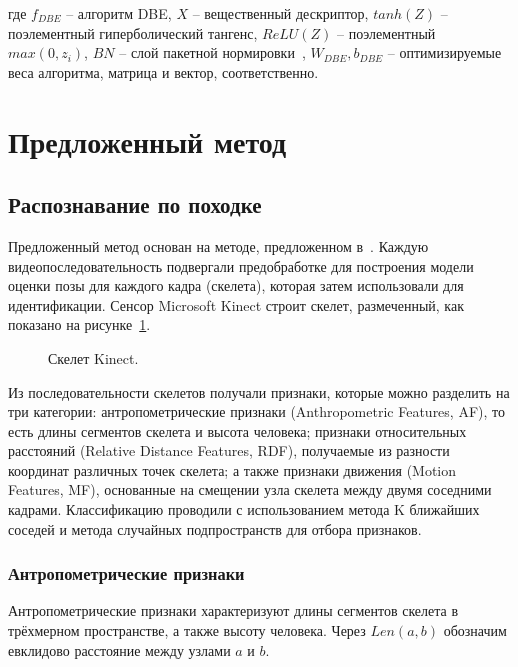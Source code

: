 \documentclass[a4paper,twoside,11pt]{article}
\numberwithin{equation}{section}
\begin{document}
где $f_{DBE}$ -- алгоритм DBE, $X$ -- вещественный дескриптор, $tanh(Z)$ -- поэлементный гиперболический тангенс, $ReLU(Z)$ -- поэлементный $max(0, z_i)$, $BN$ -- слой пакетной нормировки~\cite{ioffe2015batch}, $W_{DBE}, b_{DBE}$ -- оптимизируемые веса алгоритма, матрица и вектор, соответственно.

\section{Предложенный метод}

\subsection{Распознавание по походке}

Предложенный метод основан на методе, предложенном в~\cite{yang2016relative}. Каждую видеопоследовательность подвергали предобработке для построения модели оценки позы для каждого кадра (скелета), которая затем использовали для идентификации. Сенсор Microsoft Kinect строит скелет, размеченный, как показано на рисунке~\ref{kinnectskeleton}.

\begin{figure}[ht]
    \caption{Скелет Kinect.}
    \label{kinnectskeleton}
\end{figure}

Из последовательности скелетов получали признаки, которые можно разделить на три категории: антропометрические признаки (Anthropometric Features, AF), то есть длины сегментов скелета и высота человека; признаки относительных расстояний (Relative Distance Features, RDF), получаемые из разности координат различных точек скелета; а также признаки движения (Motion Features, MF), основанные на смещении узла скелета между двумя соседними кадрами. Классификацию проводили с использованием метода K ближайших соседей и метода случайных подпространств для отбора признаков.

\subsubsection{Антропометрические признаки}

Антропометрические признаки характеризуют длины сегментов скелета в трёхмерном пространстве, а также высоту человека. Через $Len(a, b)$ обозначим евклидово расстояние между узлами $a$ и $b$.
\end{document}
